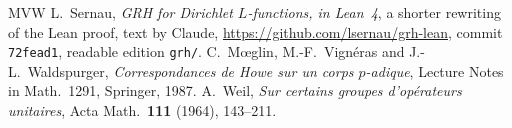 \documentclass[reqno]{amsart}
\theoremstyle{definition}
\theoremstyle{plain}
\begin{document}
\begin{thebibliography}{MVW}
 L.~Sernau, \emph{GRH for Dirichlet \(L\)-functions, in Lean~4}, a shorter rewriting of the Lean proof, text by Claude, \url{https://github.com/lsernau/grh-lean}, commit \texttt{72fead1}, readable edition \texttt{grh/}.
 C.~M\oe glin, M.-F.~Vign\'eras and J.-L.~Waldspurger, \emph{Correspondances de Howe sur un corps \(p\)-adique}, Lecture Notes in Math.\ 1291, Springer, 1987.
 A.~Weil, \emph{Sur certains groupes d'op\'erateurs unitaires}, Acta Math.\ \textbf{111} (1964), 143--211.
\end{thebibliography}
\end{document}
